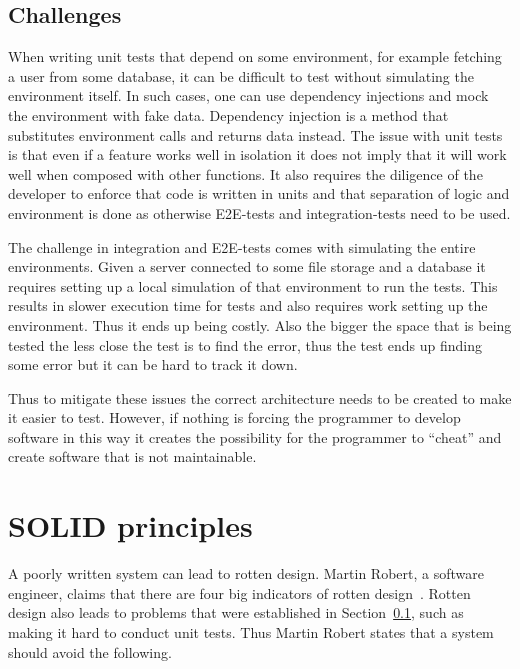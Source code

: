 \subsection{Challenges}\label{challenges}

When writing unit tests that depend on some environment, for example fetching a
user from some database, it can be difficult to test without simulating the
environment itself. In such cases, one can use dependency injections and mock the
environment with fake data. Dependency injection is a method that substitutes
environment calls and returns data instead. The issue with unit tests is that
even if a feature works well in isolation it does not imply that it will work
well when composed with other functions. It also requires the diligence of the
developer to enforce that code is written in units and that separation of logic
and environment is done as otherwise E2E-tests and integration-tests need to be
used.

The challenge in integration and E2E-tests comes with simulating the entire
environments. Given a server connected to some file storage and a database it
requires setting up a local simulation of that environment to run the tests.
This results in slower execution time for tests and also requires work setting
up the environment. Thus it ends up being costly. Also the bigger the space
that is being tested the less close the test is to find the error,
thus the test ends up finding some error but it can be hard to track it down.

Thus to mitigate these issues the correct architecture needs to be created to
make it easier to test. However, if nothing is forcing the programmer to
develop software in this way it creates the possibility for the programmer to
``cheat'' and create software that is not maintainable. 

\section{SOLID principles}\label{oop}

A poorly written system can lead to rotten design. Martin Robert, a software
engineer, claims that there are four big indicators of rotten
design~\cite{martinrobert}. Rotten design also leads to problems that were
established in Section~\ref{challenges}, such as making it hard to conduct unit
tests. Thus Martin Robert states that a system should avoid the following.

